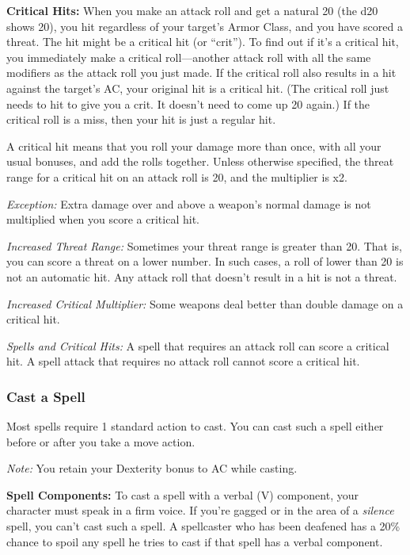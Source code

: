 \documentclass{article}
\begin{document}
\textbf{Critical Hits:} When you make an attack roll and get a natural 20 (the 
d20 shows 20), you hit regardless of your target's Armor Class, and you have scored 
a threat. The hit might be a critical hit (or ``crit''). To find out if it's a 
critical hit, you immediately make a critical roll---another attack roll with all 
the same modifiers as the attack roll you just made. If the critical roll also 
results in a hit against the target's AC, your original hit is a critical hit. 
(The critical roll just needs to hit to give you a crit. It doesn't need to come 
up 20 again.) If the critical roll is a miss, then your hit is just a regular hit.

A critical hit means that you roll your damage more than once, with all your usual 
bonuses, and add the rolls together. Unless otherwise specified, the threat range 
for a critical hit on an attack roll is 20, and the multiplier is x2.

\textit{Exception:}\textbf{ }Extra damage over and above a weapon's normal damage 
is not multiplied when you score a critical hit.

\textit{Increased Threat Range:}\textbf{ }Sometimes your threat range is greater 
than 20. That is, you can score a threat on a lower number. In such cases, a roll 
of lower than 20 is not an automatic hit. Any attack roll that doesn't result in 
a hit is not a threat.

\textit{Increased Critical Multiplier:}\textbf{ }Some weapons deal better than 
double damage on a critical hit.

\textit{Spells and Critical Hits: }A spell that requires an attack roll\textit{ 
}can score a critical hit. A spell attack that requires no attack roll\textit{ 
}cannot score a critical hit.

\vspace{12pt}
\subsubsection*{\textbf{Cast a Spell}}

Most spells require 1 standard action to cast. You can cast such a spell either 
before or after you take a move action. 

\textit{Note: }You retain your Dexterity bonus to AC while casting.

\textbf{Spell Components:} To cast a spell with a verbal (V) component, your character 
must speak in a firm voice. If you're gagged or in the area of a \textit{silence 
}spell, you can't cast such a spell. A spellcaster who has been deafened has a 
20\% chance to spoil any spell he tries to cast if that spell has a verbal component.
\end{document}
